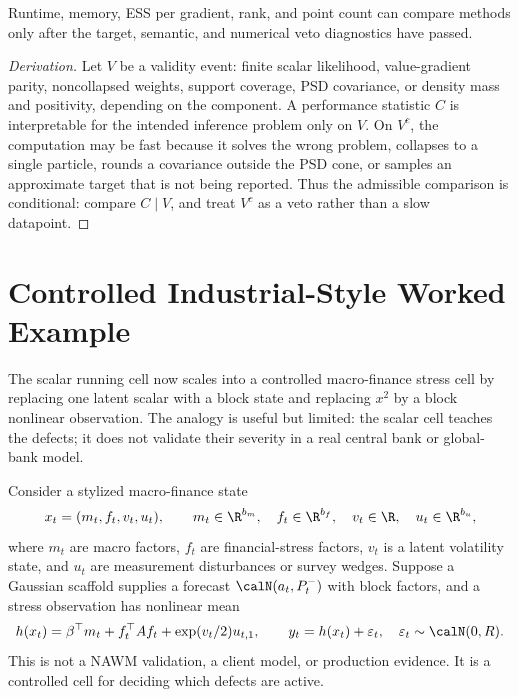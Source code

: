 \begin{proposition}
\label{prop:bf-hd-performance-after-veto}
Runtime, memory, ESS per gradient, rank, and point count can compare methods
only after the target, semantic, and numerical veto diagnostics have passed.
\end{proposition}

\begin{proof}[Derivation]
Let \(V\) be a validity event: finite scalar likelihood, value-gradient parity,
noncollapsed weights, support coverage, PSD covariance, or density mass and
positivity, depending on the component.  A performance statistic \(C\) is
interpretable for the intended inference problem only on \(V\).  On \(V^c\),
the computation may be fast because it solves the wrong problem, collapses to a
single particle, rounds a covariance outside the PSD cone, or samples an
approximate target that is not being reported.  Thus the admissible comparison
is conditional: compare \(C\mid V\), and treat \(V^c\) as a veto rather than a
slow datapoint.
\end{proof}

\section{Controlled Industrial-Style Worked Example}
\label{sec:bf-hd-industrial-worked-example}

The scalar running cell now scales into a controlled macro-finance stress cell
by replacing one latent scalar with a block state and replacing \(x^2\) by a
block nonlinear observation.  The analogy is useful but limited: the scalar
cell teaches the defects; it does not validate their severity in a real central
bank or global-bank model.

Consider a stylized macro-finance state
\[
  x_t=(m_t,f_t,v_t,u_t),\qquad
  m_t\in\R^{b_m},\quad f_t\in\R^{b_f},\quad
  v_t\in\R,\quad u_t\in\R^{b_u},
\]
where \(m_t\) are macro factors, \(f_t\) are financial-stress factors,
\(v_t\) is a latent volatility state, and \(u_t\) are measurement disturbances
or survey wedges.  Suppose a Gaussian scaffold supplies a forecast
\(\calN(a_t,P_t^-)\) with block factors, and a stress observation has nonlinear
mean
\[
  h(x_t)=\beta^\top m_t + f_t^\top A f_t + \exp(v_t/2)u_{t,1},
  \qquad
  y_t=h(x_t)+\varepsilon_t,\quad
  \varepsilon_t\sim\calN(0,R).
  \label{eq:bf-hd-worked-stress-cell}
\]
This is not a NAWM validation, a client model, or production evidence.  It is a
controlled cell for deciding which defects are active.

